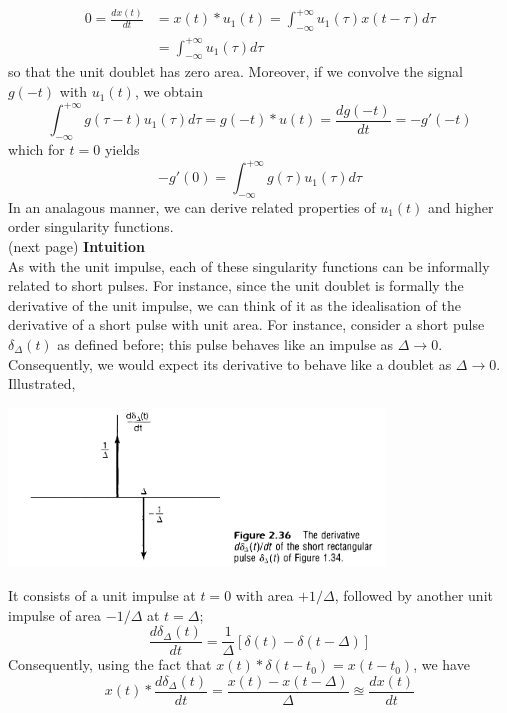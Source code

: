 \documentclass{report}
\begin{document}
\begin{align*}
0=\frac{dx(t)}{dt}&=x(t)*u_1(t)=\int^{+\infty}_{-\infty}u_1(\tau)x(t-\tau)d\tau\\
&=\int^{+\infty}_{-\infty}u_1(\tau)d\tau
\end{align*}
so that the unit doublet has zero area. Moreover, if we convolve the signal $g(-t)$ with $u_1(t)$, we obtain
\begin{equation*}
\int^{+\infty}_{-\infty}g(\tau-t)u_1(\tau)d\tau=g(-t)*u(t)=\frac{dg(-t)}{dt}=-g'(-t)
\end{equation*}
which for $t=0$ yields
\begin{equation*}
-g'(0)=\int^{+\infty}_{-\infty}g(\tau)u_1(\tau)d\tau
\end{equation*}
In an analagous manner, we can derive related properties of $u_1(t)$ and higher order singularity functions.\\
(next page)\newpage
\noindent\textbf{Intuition}\\
As with the unit impulse, each of these singularity functions can be informally related to short pulses. For instance, since the unit doublet is formally the derivative of the unit impulse, we can think 
of it as the idealisation of the derivative of a short pulse with unit area. For instance, consider a
short pulse $\delta_\Delta(t)$ as defined before; this pulse behaves like an impulse as $\Delta\to0$. Consequently, we would expect its derivative to behave like a doublet as $\Delta\to0$. Illustrated,
\begin{center}
\includegraphics[width=10cm]{a56}\\
\end{center}
It consists of a unit impulse at $t=0$ with area $+1/\Delta$, followed by another unit impulse of area $-1/\Delta$ at $t=\Delta$;
\begin{equation*}
\frac{d\delta_\Delta(t)}{dt}=\frac{1}{\Delta}[\delta(t)-\delta(t-\Delta)]
\end{equation*}
Consequently, using the fact that $x(t)*\delta(t-t_0)=x(t-t_0)$, we have
\begin{equation*}
x(t)*\frac{d\delta_\Delta(t)}{dt}=\frac{x(t)-x(t-\Delta)}{\Delta}\approxeq\frac{dx(t)}{dt}
\end{equation*}
\end{document}
